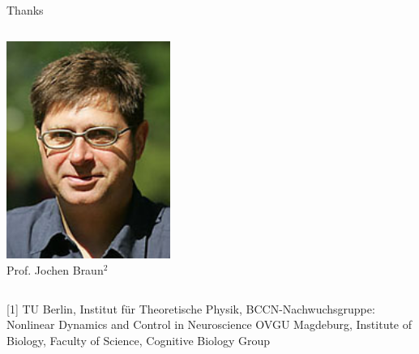 \documentclass{beamer}
\begin{document}
\begin{frame}{Thanks}
\begin{columns}[T]
     \begin{column}[T]{4cm}   
     \centering
	\includegraphics[width=0.4\textwidth]{Figures/braun.jpg} \\
	Prof. Jochen Braun$^2$ \\
     \end{column}
\break
  
  \end{columns}
\break

\vspace{1in}

\footnotesize{[1] TU Berlin, Institut f\"{u}r Theoretische Physik, BCCN-Nachwuchsgruppe: Nonlinear Dynamics and Control in Neuroscience \break
[2] OVGU Magdeburg, Institute of Biology, Faculty of Science, Cognitive Biology Group}

\end{frame}
\end{document}
